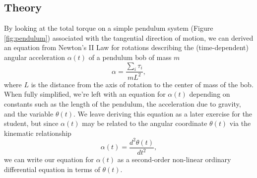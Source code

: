\documentclass{article}
\begin{document}
\subsection{Theory}
By looking at the total torque on a simple pendulum system (Figure \ref{fig:pendulum}) associated with the tangential direction of motion, we can derived an equation from Newton's II Law for rotations describing the (time-dependent) angular acceleration $\alpha(t)$ of a pendulum bob of mass $m$
\begin{equation}
    \alpha = \frac{\sum_i \tau_i}{m L^2},
\end{equation}
where $L$ is the distance from the axis of rotation to the center of mass of the bob. When fully simplified, we're left with an equation for $\alpha(t)$ depending on constants such as the length of the pendulum, the acceleration due to gravity, and the variable $\theta(t)$. We leave deriving this equation as a later exercise for the student, but since $\alpha(t)$ may be related to the angular coordinate $\theta (t)$ via the kinematic relationship
\begin{equation}
    \alpha(t) = \frac{d^2\theta(t)}{dt^2},
\end{equation}
we can write our equation for $\alpha(t)$ as a second-order non-linear ordinary differential equation in terms of $\theta(t)$. 
\end{document}

